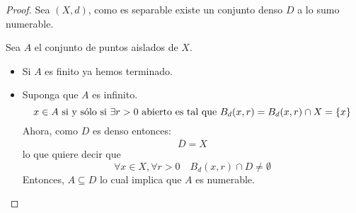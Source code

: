 \documentclass[12pt]{report}
\theoremstyle{largebreak}
\begin{document}
    \begin{proof}
        Sea $(X,d)$, como es separable existe un conjunto denso $D$ a lo sumo numerable.

        Sea $A$ el conjunto de puntos aislados de $X$.
        \begin{itemize}
            \item Si $A$ es finito ya hemos terminado.
            \item Suponga que $A$ es infinito.
            \begin{equation*}
                x\in A\textup{ si y sólo si }\exists r>0\textup{ abierto es tal que }B_d(x,r)=B_d(x,r)\cap X=\left\{ x\right\}
            \end{equation*}
            Ahora, como $D$ es denso entonces:
            \begin{equation*}
                \overline{D}=X
            \end{equation*}
            lo que quiere decir que
            \begin{equation*}
                \forall x\in X,\forall r>0\quad B_d(x,r)\cap D\neq\emptyset
            \end{equation*}
            Entonces, $A\subseteq D$ lo cual implica que $A$ es numerable.
        \end{itemize}
    \end{proof}
\end{document}
